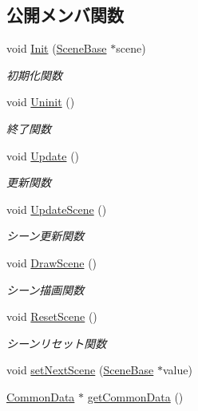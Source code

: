 \subsection*{公開メンバ関数}
\begin{DoxyCompactItemize}
\item 
void \mbox{\hyperlink{class_scene_manager_a3d14c04a921c6c670e89fbf22a719b00}{Init}} (\mbox{\hyperlink{class_scene_base}{Scene\+Base}} $\ast$scene)
\begin{DoxyCompactList}\small\item\em 初期化関数 \end{DoxyCompactList}\item 
void \mbox{\hyperlink{class_scene_manager_ae3ff21f2261fc50f1e860cf7fc3a2108}{Uninit}} ()
\begin{DoxyCompactList}\small\item\em 終了関数 \end{DoxyCompactList}\item 
void \mbox{\hyperlink{class_scene_manager_a63dcf65832d6a2c190bf496d9a3b00a3}{Update}} ()
\begin{DoxyCompactList}\small\item\em 更新関数 \end{DoxyCompactList}\item 
void \mbox{\hyperlink{class_scene_manager_a493bc0d65558ce004f6f248a185ba956}{Update\+Scene}} ()
\begin{DoxyCompactList}\small\item\em シーン更新関数 \end{DoxyCompactList}\item 
void \mbox{\hyperlink{class_scene_manager_a828b35826f757b8af34aa767c6b40378}{Draw\+Scene}} ()
\begin{DoxyCompactList}\small\item\em シーン描画関数 \end{DoxyCompactList}\item 
void \mbox{\hyperlink{class_scene_manager_a1759161a38025ec8212dc98439fd7335}{Reset\+Scene}} ()
\begin{DoxyCompactList}\small\item\em シーンリセット関数 \end{DoxyCompactList}\item 
void \mbox{\hyperlink{class_scene_manager_a208cc1690dcb260ae7fb94d13118f6ce}{set\+Next\+Scene}} (\mbox{\hyperlink{class_scene_base}{Scene\+Base}} $\ast$value)
\item 
\mbox{\hyperlink{class_scene_manager_1_1_common_data}{Common\+Data}} $\ast$ \mbox{\hyperlink{class_scene_manager_a73b2a1c2be8f5b9027af7d88d2ec6457}{get\+Common\+Data}} ()

\end{DoxyCompactItemize}
